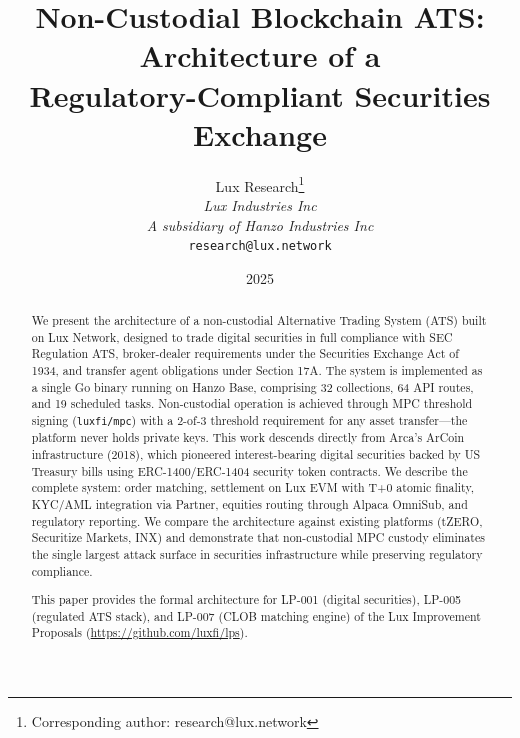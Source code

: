 \documentclass[11pt,a4paper]{article}
\title{Non-Custodial Blockchain ATS: Architecture of a\\Regulatory-Compliant Securities Exchange}
\author{
Lux Research\thanks{Corresponding author: research@lux.network}\\
\textit{Lux Industries Inc}\\
\textit{A subsidiary of Hanzo Industries Inc}\\
\texttt{research@lux.network}
}
\date{2025}
\begin{document}
\luxcoverpage

\begin{abstract}
We present the architecture of a non-custodial Alternative Trading System (ATS) built on Lux Network, designed to trade digital securities in full compliance with SEC Regulation ATS, broker-dealer requirements under the Securities Exchange Act of 1934, and transfer agent obligations under Section 17A. The system is implemented as a single Go binary running on Hanzo Base, comprising 32 collections, 64 API routes, and 19 scheduled tasks. Non-custodial operation is achieved through MPC threshold signing (\texttt{luxfi/mpc}) with a 2-of-3 threshold requirement for any asset transfer---the platform never holds private keys. This work descends directly from Arca's ArCoin infrastructure (2018), which pioneered interest-bearing digital securities backed by US Treasury bills using ERC-1400/ERC-1404 security token contracts. We describe the complete system: order matching, settlement on Lux EVM with T+0 atomic finality, KYC/AML integration via Partner, equities routing through Alpaca OmniSub, and regulatory reporting. We compare the architecture against existing platforms (tZERO, Securitize Markets, INX) and demonstrate that non-custodial MPC custody eliminates the single largest attack surface in securities infrastructure while preserving regulatory compliance.

This paper provides the formal architecture for LP-001 (digital securities), LP-005 (regulated ATS stack), and LP-007 (CLOB matching engine) of the Lux Improvement Proposals (\url{https://github.com/luxfi/lps}).
\end{abstract}













\end{document}
